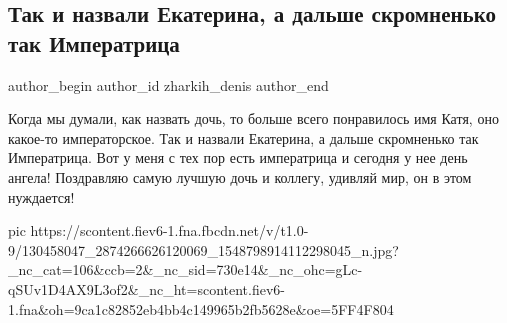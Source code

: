  
 
 
 
 
 
\subsection{Так и назвали Екатерина, а дальше скромненько так Императрица}
\label{sec:07_12_2020.fb.zharkih_denis.2.dr_zharkih_katja}
\ifcmt
	author_begin
   author_id zharkih_denis
	author_end
\fi


Когда мы думали, как назвать дочь, то больше всего понравилось имя Катя, оно
какое-то императорское. Так и назвали Екатерина, а дальше скромненько так
Императрица. Вот у меня с тех пор есть императрица и сегодня у нее день ангела!
Поздравляю самую лучшую дочь и коллегу, удивляй мир, он в этом нуждается!

\ifcmt
pic https://scontent.fiev6-1.fna.fbcdn.net/v/t1.0-9/130458047_2874266626120069_1548798914112298045_n.jpg?_nc_cat=106&ccb=2&_nc_sid=730e14&_nc_ohc=gLc-qSUv1D4AX9L3of2&_nc_ht=scontent.fiev6-1.fna&oh=9ca1c82852eb4bb4c149965b2fb5628e&oe=5FF4F804
\fi
